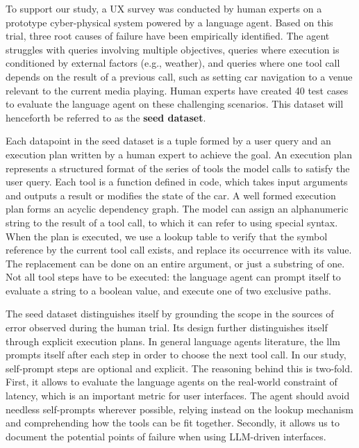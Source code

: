 To support our study, a UX survey was conducted by human experts on a prototype cyber-physical system powered by a language agent. Based on this trial, three root causes of failure have been empirically identified. The agent struggles with queries involving multiple objectives, queries where execution is conditioned by external factors (e.g., weather), and queries where one tool call depends on the result of a previous call, such as setting car navigation to a venue relevant to the current media playing. Human experts have created 40 test cases to evaluate the language agent on these challenging scenarios. This dataset will henceforth be referred to as the \textbf{seed dataset}.

\pskip

Each datapoint in the seed dataset is a tuple formed by a user query and an execution plan written by a human expert to achieve the goal. An execution plan represents a structured format of the series of tools the model calls to satisfy the user query. Each tool is a function defined in code, which takes input arguments and outputs a result or modifies the state of the car. A well formed execution plan forms an acyclic dependency graph. The model can assign an alphanumeric string to the result of a tool call, to which it can refer to using special syntax. When the plan is executed, we use a lookup table to verify that the  symbol reference by the current tool call exists, and replace its occurrence with its value. The replacement can be done on an entire argument, or just a substring of one. Not all tool steps have to be executed: the language agent can prompt itself to evaluate a string to a boolean value, and execute one of two exclusive paths.

\pskip

\pskip

The seed dataset distinguishes itself by grounding the scope in the sources of error observed during the human trial. Its design further distinguishes itself through explicit execution plans. In general language agents literature, the \gls{llm} prompts itself after each step in order to choose the next tool call. In our study, self-prompt steps are optional and explicit. The reasoning behind this is two-fold. First, it allows to evaluate the language agents on the real-world constraint of latency, which is an important metric for user interfaces. The agent should avoid needless self-prompts wherever possible, relying instead on the lookup mechanism and comprehending how the tools can be fit together. Secondly, it allows us to document the potential points of failure when using LLM-driven interfaces.


